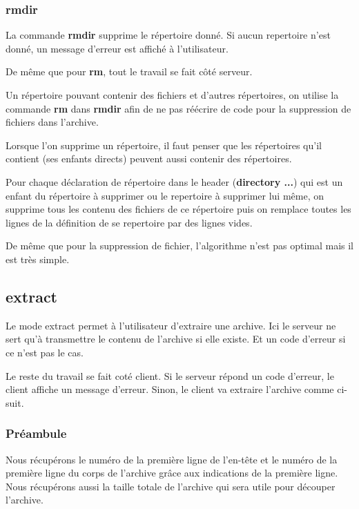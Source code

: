 \documentclass[titlepage]{article}
\begin{document}
	\subsubsection{rmdir}

	La commande \textbf{rmdir} supprime le répertoire donné. Si aucun repertoire n'est donné, un message d'erreur est affiché à l'utilisateur.

	De même que pour \textbf{rm}, tout le travail se fait côté serveur.

	Un répertoire pouvant contenir des fichiers et d'autres répertoires, on utilise la commande \textbf{rm} dans \textbf{rmdir} afin de ne pas réécrire de code pour la suppression de fichiers dans l'archive.

	Lorsque l'on supprime un répertoire, il faut penser que les répertoires qu'il contient (ses enfants directs) peuvent aussi contenir des répertoires. 

	Pour chaque déclaration de répertoire dans le header (\textbf{directory ...}) qui est un enfant du répertoire à supprimer ou le repertoire à supprimer lui même, on supprime tous les contenu des fichiers de ce répertoire puis on remplace toutes les lignes de la définition de se repertoire par des lignes vides.

	De même que pour la suppression de fichier, l'algorithme n'est pas optimal mais il est très simple.  

	\subsection{extract}

	Le mode extract permet à l’utilisateur d’extraire une archive. Ici le serveur ne sert qu’à transmettre le contenu de l’archive si elle existe. Et un code d’erreur si ce n’est pas le cas. 

	Le reste du travail se fait coté client. Si le serveur répond un code d’erreur, le client affiche un message d’erreur. Sinon, le client va extraire l’archive comme ci-suit.

	\subsubsection{Préambule}

	Nous récupérons le numéro de la première ligne de l'en-tête et le numéro de la première ligne du corps de l'archive grâce aux indications de la première ligne. Nous récupérons aussi la taille totale de l’archive qui sera utile pour découper l'archive.
\end{document}
